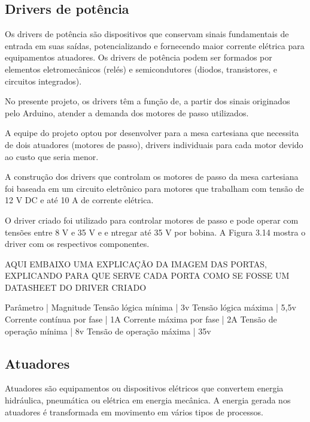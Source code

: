 \subsection{Drivers de potência}

Os drivers de potência são dispositivos que conservam sinais fundamentais de entrada em suas saídas, potencializando 
e fornecendo maior corrente elétrica para equipamentos atuadores. Os drivers de potência podem ser formados por elementos 
eletromecânicos (relés) e semicondutores (diodos, transistores, e circuitos integrados). 

No presente projeto, os drivers têm a função de, a partir dos sinais originados pelo Arduino, atender a demanda dos 
motores de passo utilizados.

A equipe do projeto optou por desenvolver para a mesa cartesiana que necessita de dois atuadores (motores de passo), 
drivers individuais para cada motor devido ao custo que seria menor.

A construção dos drivers que controlam os motores de passo da mesa cartesiana foi baseada em um circuito eletrônico 
para motores que trabalham com tensão de 12 V DC e até 10 A de corrente elétrica. 


O driver criado foi utilizado para controlar motores de passo e pode operar com tensões entre 8 V e 35 V e e
ntregar até 35 V por bobina. A Figura 3.14 mostra o driver com os respectivos componentes.


AQUI EMBAIXO UMA EXPLICAÇÃO DA IMAGEM DAS PORTAS, EXPLICANDO PARA QUE SERVE CADA PORTA COMO SE FOSSE UM DATASHEET 
DO DRIVER CRIADO


Parâmetro | Magnitude
Tensão lógica mínima | 3v
Tensão lógica máxima | 5,5v
Corrente contínua por fase | 1A
Corrente máxima por fase | 2A
Tensão de operação mínima | 8v
Tensão de operação máxima | 35v

\subsection{Atuadores}

Atuadores são equipamentos ou dispositivos elétricos que convertem energia hidráulica, pneumática ou elétrica em energia 
mecânica. A energia gerada nos atuadores é transformada em movimento em vários tipos de processos.

